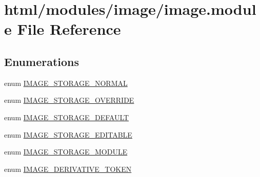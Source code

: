 \hypertarget{image_8module}{
\section{html/modules/image/image.module File Reference}
\label{image_8module}
}
\subsection*{Enumerations}
\begin{DoxyCompactItemize}
\item 
enum \hyperlink{image_8module_a1b56f6b9594bbb7ab736ebcb17dfb6e0}{IMAGE\_\-STORAGE\_\-NORMAL} 
\item 
enum \hyperlink{image_8module_adfb4172c27b27b4689c40abb24d61ebe}{IMAGE\_\-STORAGE\_\-OVERRIDE} 
\item 
enum \hyperlink{image_8module_a2d98c7ee570daf265a73daaf0146e7b6}{IMAGE\_\-STORAGE\_\-DEFAULT} 
\item 
enum \hyperlink{image_8module_a09997555da59d60fccb6435974c29003}{IMAGE\_\-STORAGE\_\-EDITABLE} 
\item 
enum \hyperlink{image_8module_a5eeb2eba5576aacf25051422d667de24}{IMAGE\_\-STORAGE\_\-MODULE} 
\item 
enum \hyperlink{image_8module_a8a6f7ae8bb3763bbb2a257f43d110493}{IMAGE\_\-DERIVATIVE\_\-TOKEN} 
\end{DoxyCompactItemize}
